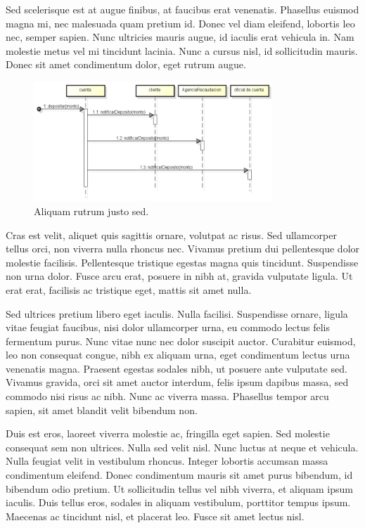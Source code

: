 \documentclass[titlepage,a4paper]{article}
\begin{document}
Sed scelerisque est at augue finibus, at faucibus erat venenatis. Phasellus euismod magna mi, nec malesuada quam pretium id. Donec vel diam eleifend, lobortis leo nec, semper sapien. Nunc ultricies mauris augue, id iaculis erat vehicula in. Nam molestie metus vel mi tincidunt lacinia. Nunc a cursus nisl, id sollicitudin mauris. Donec sit amet condimentum dolor, eget rutrum augue.

\begin{figure}[H]
\centering
\includegraphics[width=0.8\textwidth]{diagrama_secuencia01.png}
\caption{\label{fig:seq01}Aliquam rutrum justo sed.}
\end{figure}

Cras est velit, aliquet quis sagittis ornare, volutpat ac risus. Sed ullamcorper tellus orci, non viverra nulla rhoncus nec. Vivamus pretium dui pellentesque dolor molestie facilisis. Pellentesque tristique egestas magna quis tincidunt. Suspendisse non urna dolor. Fusce arcu erat, posuere in nibh at, gravida vulputate ligula. Ut erat erat, facilisis ac tristique eget, mattis sit amet nulla.

Sed ultrices pretium libero eget iaculis. Nulla facilisi. Suspendisse ornare, ligula vitae feugiat faucibus, nisi dolor ullamcorper urna, eu commodo lectus felis fermentum purus. Nunc vitae nunc nec dolor suscipit auctor. Curabitur euismod, leo non consequat congue, nibh ex aliquam urna, eget condimentum lectus urna venenatis magna. Praesent egestas sodales nibh, ut posuere ante vulputate sed. Vivamus gravida, orci sit amet auctor interdum, felis ipsum dapibus massa, sed commodo nisi risus ac nibh. Nunc ac viverra massa. Phasellus tempor arcu sapien, sit amet blandit velit bibendum non.

Duis est eros, laoreet viverra molestie ac, fringilla eget sapien. Sed molestie consequat sem non ultrices. Nulla sed velit nisl. Nunc luctus at neque et vehicula. Nulla feugiat velit in vestibulum rhoncus. Integer lobortis accumsan massa condimentum eleifend. Donec condimentum mauris sit amet purus bibendum, id bibendum odio pretium. Ut sollicitudin tellus vel nibh viverra, et aliquam ipsum iaculis. Duis tellus eros, sodales in aliquam vestibulum, porttitor tempus ipsum. Maecenas ac tincidunt nisl, et placerat leo. Fusce sit amet lectus nisl.
\end{document}
